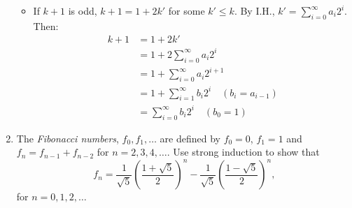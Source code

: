 \begin{enumerate}
{\begin{itemize}
\item If $k+1$ is odd, $k+1 = 1 + 2k'$ for some $k' \leq k$. By I.H., $k' = \sum_{i=0}^{\infty}a_{i}2^{i}$. Then:
\begin{align*}
k+1 &= 1 + 2 k' \\
&= 1 + 2 \sum_{i=0}^{\infty}a_{i}2^{i} \\
&= 1 + \sum_{i=0}^{\infty}a_{i}2^{i+1} \\
&= 1 + \sum_{i=1}^{\infty}b_{i}2^{i} \quad (b_i = a_{i-1}) \\
&= \sum_{i=0}^{\infty}b_{i}2^{i} \quad (b_0 = 1)
\end{align*}
\end{itemize}
}

\item \strmedium The \textit{Fibonacci numbers}, $f_{0},f_{1},\dots$ are defined by $f_{0}=0$, $f_{1}=1$ and $f_{n}=f_{n-1}+f_{n-2}$ for $n=2,3,4,\dots$. Use strong induction to show that
\begin{equation*}
f_n=\frac{1}{\sqrt{5}}\left(\frac{1+\sqrt{5}}{2}\right)^{n}
- \frac{1}{\sqrt{5}}\left(\frac{1-\sqrt{5}}{2}\right)^{n},
\end{equation*}
for $n=0,1,2,\dots$

\end{enumerate}
